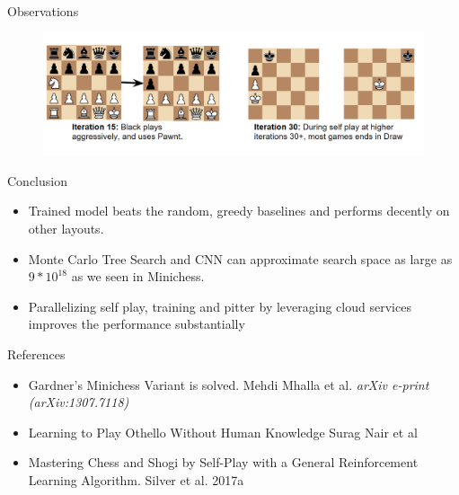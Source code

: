 \documentclass[final]{beamer}
\newlength{\onecolwid}
\begin{document}
\begin{frame}[t]
\begin{columns}[t]
\begin{column}{\onecolwid}
\begin{block}{Observations}
\begin{figure}
\includegraphics[width=1.0\linewidth]{attack_2.png}
\end{figure}


\end{block}


\begin{block}{Conclusion}

\begin{itemize}
\item Trained model beats the random, greedy baselines and performs decently on other layouts.
\item Monte Carlo Tree Search and CNN can approximate search space as large as $9 * 10^{18}$ as we seen in Minichess.
\item Parallelizing self play, training and pitter by leveraging cloud services improves the performance substantially
\end{itemize}

\end{block}





\begin{block}{References}


\begin{itemize}{}

\item Gardner's Minichess Variant is solved. Mehdi Mhalla et al. {\em arXiv e-print (arXiv:1307.7118) }
\item Learning to Play Othello Without Human Knowledge Surag Nair et al
\item Mastering Chess and Shogi by Self-Play with a General Reinforcement Learning Algorithm. Silver et al. 2017a
\end{itemize}


\end{block}
\end{column}
\end{columns}
\end{frame}
\end{document}
